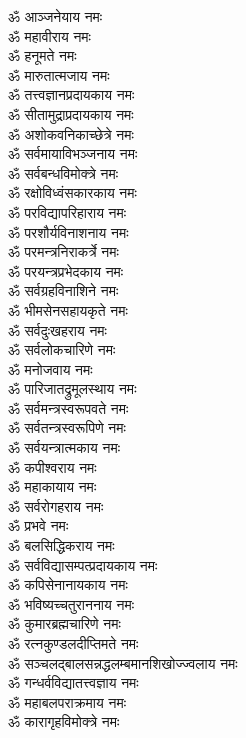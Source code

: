 \begin{multicols}{2}
\begin{flushleft}
ॐ आञ्जनेयाय नमः\\
ॐ महावीराय नमः\\
ॐ हनूमते नमः\\
ॐ मारुतात्मजाय नमः\\
ॐ तत्त्वज्ञानप्रदायकाय नमः\\
ॐ सीतामुद्राप्रदायकाय नमः\\
ॐ अशोकवनिकाच्छेत्रे नमः\\
ॐ सर्वमायाविभञ्जनाय नमः\\
ॐ सर्वबन्धविमोक्त्रे नमः\\
ॐ रक्षोविध्वंसकारकाय नमः\hfill{}\\
ॐ परविद्यापरिहाराय नमः\\
ॐ परशौर्यविनाशनाय नमः\\
ॐ परमन्त्रनिराकर्त्रे नमः\\
ॐ परयन्त्रप्रभेदकाय नमः\\
ॐ सर्वग्रहविनाशिने नमः\\
ॐ भीमसेनसहायकृते नमः\\
ॐ सर्वदुःखहराय नमः\\
ॐ सर्वलोकचारिणे नमः\\
ॐ मनोजवाय नमः\\
ॐ पारिजातद्रुमूलस्थाय नमः\hfill{}\\
ॐ सर्वमन्त्रस्वरूपवते नमः\\
ॐ सर्वतन्त्रस्वरूपिणे नमः\\
ॐ सर्वयन्त्रात्मकाय नमः\\
ॐ कपीश्वराय नमः\\
ॐ महाकायाय नमः\\
ॐ सर्वरोगहराय नमः\\
ॐ प्रभवे नमः\\
ॐ बलसिद्धिकराय नमः\\
ॐ सर्वविद्यासम्पत्प्रदायकाय नमः\\
ॐ कपिसेनानायकाय नमः\hfill{}\\
ॐ भविष्यच्चतुराननाय नमः\\
ॐ कुमारब्रह्मचारिणे नमः\\
ॐ रत्नकुण्डलदीप्तिमते नमः\\
ॐ सञ्चलद्बालसन्नद्ध\-लम्बमानशिखोज्ज्वलाय नमः\\
ॐ गन्धर्वविद्यातत्त्वज्ञाय नमः\\
ॐ महाबलपराक्रमाय नमः\\
ॐ कारागृहविमोक्त्रे नमः\\

\end{flushleft}
\end{multicols}
